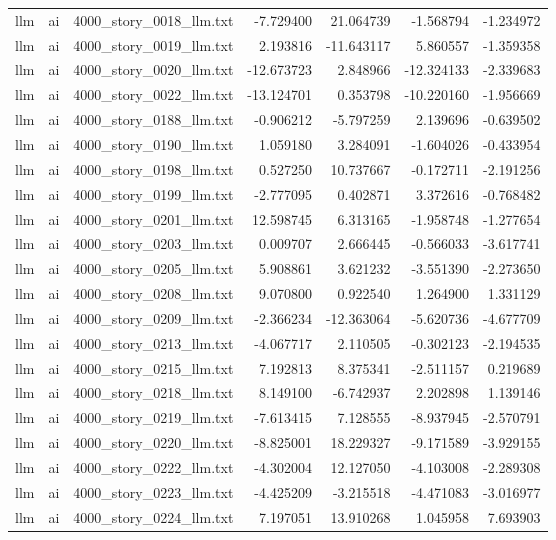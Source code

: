 \begin{longtable}{lllrrrr}
llm & ai & 4000\_story\_0018\_llm.txt & -7.729400 & 21.064739 & -1.568794 & -1.234972 \\
llm & ai & 4000\_story\_0019\_llm.txt & 2.193816 & -11.643117 & 5.860557 & -1.359358 \\
llm & ai & 4000\_story\_0020\_llm.txt & -12.673723 & 2.848966 & -12.324133 & -2.339683 \\
llm & ai & 4000\_story\_0022\_llm.txt & -13.124701 & 0.353798 & -10.220160 & -1.956669 \\
llm & ai & 4000\_story\_0188\_llm.txt & -0.906212 & -5.797259 & 2.139696 & -0.639502 \\
llm & ai & 4000\_story\_0190\_llm.txt & 1.059180 & 3.284091 & -1.604026 & -0.433954 \\
llm & ai & 4000\_story\_0198\_llm.txt & 0.527250 & 10.737667 & -0.172711 & -2.191256 \\
llm & ai & 4000\_story\_0199\_llm.txt & -2.777095 & 0.402871 & 3.372616 & -0.768482 \\
llm & ai & 4000\_story\_0201\_llm.txt & 12.598745 & 6.313165 & -1.958748 & -1.277654 \\
llm & ai & 4000\_story\_0203\_llm.txt & 0.009707 & 2.666445 & -0.566033 & -3.617741 \\
llm & ai & 4000\_story\_0205\_llm.txt & 5.908861 & 3.621232 & -3.551390 & -2.273650 \\
llm & ai & 4000\_story\_0208\_llm.txt & 9.070800 & 0.922540 & 1.264900 & 1.331129 \\
llm & ai & 4000\_story\_0209\_llm.txt & -2.366234 & -12.363064 & -5.620736 & -4.677709 \\
llm & ai & 4000\_story\_0213\_llm.txt & -4.067717 & 2.110505 & -0.302123 & -2.194535 \\
llm & ai & 4000\_story\_0215\_llm.txt & 7.192813 & 8.375341 & -2.511157 & 0.219689 \\
llm & ai & 4000\_story\_0218\_llm.txt & 8.149100 & -6.742937 & 2.202898 & 1.139146 \\
llm & ai & 4000\_story\_0219\_llm.txt & -7.613415 & 7.128555 & -8.937945 & -2.570791 \\
llm & ai & 4000\_story\_0220\_llm.txt & -8.825001 & 18.229327 & -9.171589 & -3.929155 \\
llm & ai & 4000\_story\_0222\_llm.txt & -4.302004 & 12.127050 & -4.103008 & -2.289308 \\
llm & ai & 4000\_story\_0223\_llm.txt & -4.425209 & -3.215518 & -4.471083 & -3.016977 \\
llm & ai & 4000\_story\_0224\_llm.txt & 7.197051 & 13.910268 & 1.045958 & 7.693903 \\

\end{longtable}
